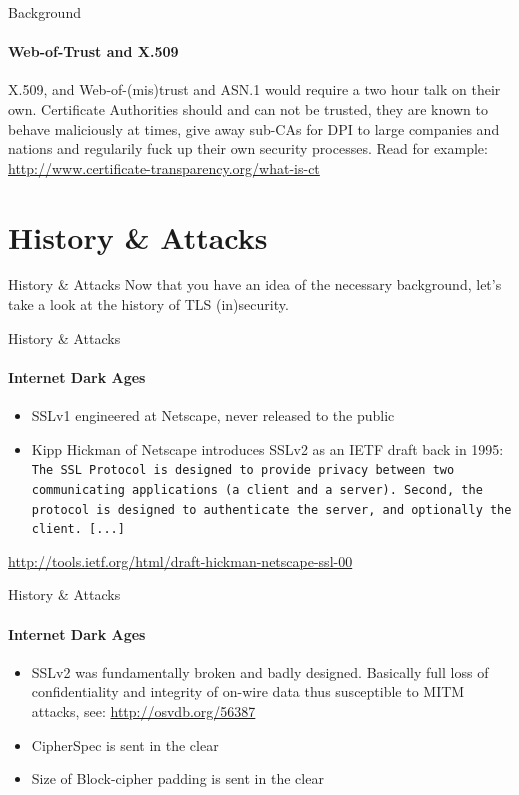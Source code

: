 \documentclass[hyperref={draft}]{beamer}
\begin{document}
\begin{frame}{Background}
  \framesubtitle{Web-of-Trust and X.509}
  X.509, and Web-of-(mis)trust and ASN.1 would require a two hour talk on their own.
  \newline
  \newline
  Certificate Authorities should and can not be trusted, they are known to behave maliciously at times, give away sub-CAs for DPI to large companies and nations and regularily fuck up their own security processes.
  \newline
  \newline
  Read for example: \url{http://www.certificate-transparency.org/what-is-ct}
\end{frame}


\section{History \& Attacks}

\begin{frame}{History \& Attacks}
  Now that you have an idea of the necessary background, let's take a look at the history of TLS (in)security. 
\end{frame}

\begin{frame}{History \& Attacks}
  \framesubtitle{Internet Dark Ages}
  \begin{itemize}
    \item SSLv1 engineered at Netscape, never released to the public
    \item Kipp Hickman of Netscape introduces SSLv2 as an IETF draft back in 1995:
      \newline
      \newline
      \texttt{The SSL Protocol is designed to provide privacy between two communicating applications (a client and a server). Second, the protocol is designed to authenticate the server, and optionally the client. [...]}
  \end{itemize}
  \vspace{50px}

  \tiny\url{http://tools.ietf.org/html/draft-hickman-netscape-ssl-00}
\end{frame}

\begin{frame}{History \& Attacks}
  \framesubtitle{Internet Dark Ages}
  \begin{itemize}
    \item SSLv2 was fundamentally broken and badly designed. Basically full loss of confidentiality and integrity of on-wire data thus susceptible to MITM attacks, see: \url{http://osvdb.org/56387}
    \item CipherSpec is sent in the clear
    \item Size of Block-cipher padding is sent in the clear
  \end{itemize}
\end{frame}
\end{document}
